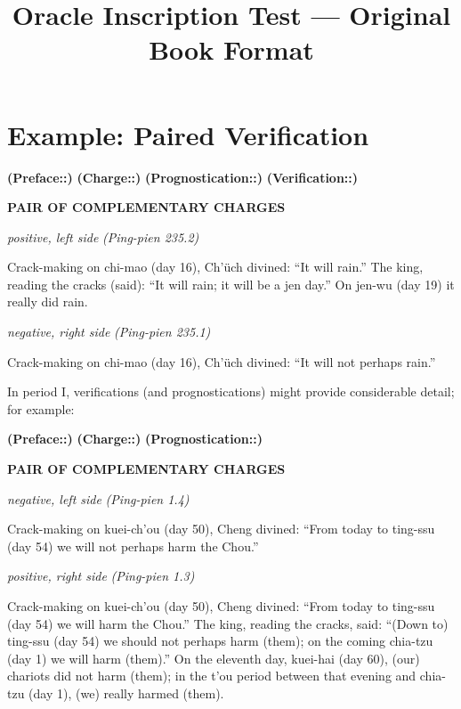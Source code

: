 \documentclass{article}
\title{Oracle Inscription Test --- Original Book Format}
\newcommand{\inscriptionref}[1]{\textit{(#1)}}
\newcommand{\inscriptionlabel}[1]{\textbf{(#1:)}}
\newcommand{\inscriptionside}[1]{\emph{#1}}
\newcommand{\inscriptionsection}[1]{%
  \par\vspace{0.5\baselineskip}
  \noindent\textbf{\MakeUppercase{#1}}%
  \par\vspace{0.3\baselineskip}
}
\newenvironment{inscriptionblock}{%
  \par\medskip
  \noindent\begin{minipage}{\textwidth}
  \setlength{\parindent}{0pt}
}{%
  \end{minipage}
  \medskip
}
\begin{document}
\maketitle

\section*{Example: Paired Verification}

\inscriptionlabel{Preface:} \inscriptionlabel{Charge:} 
\inscriptionlabel{Prognostication:} \inscriptionlabel{Verification:}

\inscriptionsection{PAIR OF COMPLEMENTARY CHARGES}

\begin{inscriptionblock}
\inscriptionside{positive, left side}
\inscriptionref{Ping-pien 235.2}

Crack-making on chi-mao (day 16), Ch'üch divined:
``It will rain.''
The king, reading the cracks (said):
``It will rain; it will be a jen day.''
On jen-wu (day 19) it really did rain.
\end{inscriptionblock}

\begin{inscriptionblock}
\inscriptionside{negative, right side}
\inscriptionref{Ping-pien 235.1}

Crack-making on chi-mao (day 16), Ch'üch divined:
``It will not perhaps rain.''
\end{inscriptionblock}

In period I, verifications (and prognostications) might provide considerable detail; for example:

\inscriptionlabel{Preface:} \inscriptionlabel{Charge:}
\inscriptionlabel{Prognostication:}

\inscriptionsection{PAIR OF COMPLEMENTARY CHARGES}

\begin{inscriptionblock}
\inscriptionside{negative, left side}
\inscriptionref{Ping-pien 1.4}

Crack-making on kuei-ch'ou (day 50), Cheng divined:
``From today to ting-ssu (day 54) we will not perhaps harm the Chou.''
\end{inscriptionblock}

\begin{inscriptionblock}
\inscriptionside{positive, right side}
\inscriptionref{Ping-pien 1.3}

Crack-making on kuei-ch'ou (day 50), Cheng divined:
``From today to ting-ssu (day 54) we will harm the Chou.''
The king, reading the cracks, said:
``(Down to) ting-ssu (day 54) we should not perhaps harm (them); on the coming chia-tzu (day 1) we will harm (them).''
On the eleventh day, kuei-hai (day 60), (our) chariots did not harm (them); in the t'ou period between that evening and chia-tzu (day 1), (we) really harmed (them).
\end{inscriptionblock}
\end{document}
